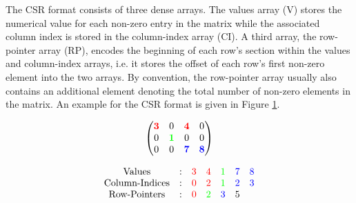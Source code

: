     The CSR format consists of three dense arrays. The values array (V) stores the numerical value for each non-zero
    entry in the matrix while the associated column index is stored in the column-index array (CI). A third array, the
    row-pointer array (RP), encodes the beginning of each row's section within the values and column-index arrays, i.e.
    it stores the offset of each row's first non-zero element into the two arrays. By convention, the row-pointer array
    usually also contains an additional element denoting the total number of non-zero elements in the matrix. An example
    for the CSR format is given in Figure \ref{fig:csr_example}.

    \begin{figure}[ht]
      \centering
      \captionsetup{width=0.9\columnwidth}
      \begin{minipage}{0.4\textwidth}
        \centering
        $$
        \begin{pmatrix}
          \color{red}{\bm{3}} &                     0 &  \color{red}{\bm{4}} &                    0 \\
                            0 & \color{green}{\bm{1}} &                    0 &                    0 \\
                            0 &                     0 & \color{blue}{\bm{7}} & \color{blue}{\bm{8}} \\
        \end{pmatrix}
        $$
      \end{minipage}
      \begin{minipage}{0.4\textwidth}
        \centering
        $$
        \begin{matrix}
          \text{Values}  & : & \color{red}{3} &   \color{red}{4} & \color{green}{1} & \color{blue}{7} & \color{blue}{8} \\
          \text{Column-Indices} & : & \color{red}{0} &   \color{red}{2} & \color{green}{1} & \color{blue}{2} & \color{blue}{3} \\
          \text{Row-Pointers} & : & \color{red}{0} & \color{green}{2} &  \color{blue}{3} &               5 &                 \\
        \end{matrix}
        $$
      \end{minipage}
      \label{fig:csr_example}
    \end{figure}

